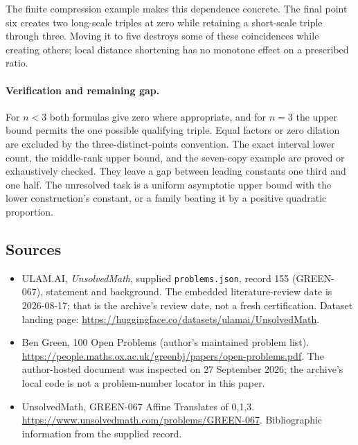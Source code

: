 \documentclass[11pt,a4paper]{article}
\begin{document}
The finite compression example makes this dependence concrete. The final point six creates two long-scale triples at zero while retaining a short-scale triple through three. Moving it to five destroys some of these coincidences while creating others; local distance shortening has no monotone effect on a prescribed ratio.

\paragraph{Verification and remaining gap.}
For $n<3$ both formulas give zero where appropriate, and for $n=3$ the upper bound permits the one possible qualifying triple. Equal factors or zero dilation are excluded by the three-distinct-points convention. The exact interval lower count, the middle-rank upper bound, and the seven-copy example are proved or exhaustively checked. They leave a gap between leading constants one third and one half. The unresolved task is a uniform asymptotic upper bound with the lower construction's constant, or a family beating it by a positive quadratic proportion.

\subsection{Sources}

{\small

\begin{itemize}

\item[\hypertarget{source:155:1}{S1}] ULAM.AI, \emph{UnsolvedMath}, supplied \texttt{problems.json}, record 155 (GREEN-067), statement and background. The embedded literature-review date is 2026-08-17; that is the archive’s review date, not a fresh certification. Dataset landing page: \url{https://huggingface.co/datasets/ulamai/UnsolvedMath}.

\item[\hypertarget{source:155:2}{S2}] Ben Green, 100 Open Problems (author’s maintained problem list). \url{https://people.maths.ox.ac.uk/greenbj/papers/open-problems.pdf}. The author-hosted document was inspected on 27 September 2026; the archive’s local code is not a problem-number locator in this paper.

\item[\hypertarget{source:155:3}{S3}] UnsolvedMath, GREEN-067 Affine Translates of {0,1,3}. \url{https://www.unsolvedmath.com/problems/GREEN-067}. Bibliographic information from the supplied record.

\end{itemize}

}

\label{end:155}
\end{document}
